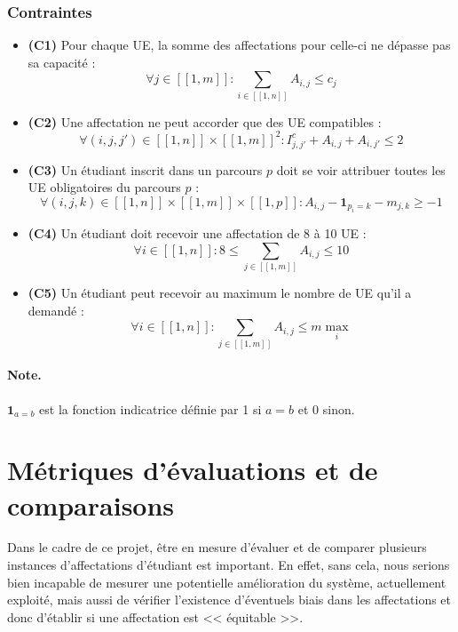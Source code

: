 \documentclass{rapport}
\theoremstyle{definition}
\theoremstyle{remark}
\theoremstyle{plain}
\theoremstyle{definition}
\theoremstyle{remark}
\newcommand{\llbracket}{[\![}
\newcommand{\rrbracket}{]\!]}
\begin{document}
\subsubsection{Contraintes}
\begin{itemize}
    \item \textbf{(C1)} \og Pour chaque UE, la somme des affectations pour celle-ci ne dépasse pas sa capacité \fg{} :
    \[
    \forall j \in \llbracket 1,m \rrbracket : \sum_{i \in \llbracket 1,n \rrbracket} A_{i,j} \le c_j
    \]

    \item \textbf{(C2)} \og Une affectation ne peut accorder que des UE compatibles \fg{} :
    \[
    \forall (i,j,j') \in \llbracket 1,n \rrbracket \times \llbracket 1,m \rrbracket^2 : I^c_{j,j'} + A_{i,j} + A_{i,j'} \le 2
    \]

    \item \textbf{(C3)} \og Un étudiant inscrit dans un parcours $p$ doit se voir attribuer toutes les UE obligatoires du parcours $p$ \fg{} :
    \[
    \forall (i,j,k) \in \llbracket 1,n \rrbracket \times \llbracket 1,m \rrbracket \times \llbracket 1,p \rrbracket : A_{i,j} - \mathbf{1}_{p_i=k} - m_{j,k} \ge -1
    \]

    \item \textbf{(C4)} \og Un étudiant doit recevoir une affectation de 8 à 10 UE \fg{} :
    \[
    \forall i \in \llbracket 1,n \rrbracket : 8 \le \sum_{j \in \llbracket 1,m \rrbracket} A_{i,j} \le 10
    \]

    \item \textbf{(C5)} \og Un étudiant peut recevoir au maximum le nombre de UE qu'il a demandé \fg{} :
    \[
    \forall i \in \llbracket 1,n \rrbracket : \sum_{j \in \llbracket 1,m \rrbracket} A_{i,j} \le m\!\max_i
    \]
\end{itemize}

\paragraph{Note.}
$\mathbf{1}_{a=b}$ est la fonction indicatrice définie par 1 si $a=b$ et 0 sinon.


\section{Métriques d'évaluations et de comparaisons}

Dans le cadre de ce projet, être en mesure d'évaluer et de comparer plusieurs instances d'affectations d'étudiant est important.
En effet, sans cela, nous serions bien incapable de mesurer une potentielle amélioration du système, actuellement exploité, mais aussi de vérifier l'existence d'éventuels biais
dans les affectations et donc d'établir si une affectation est << équitable >>.
\end{document}

